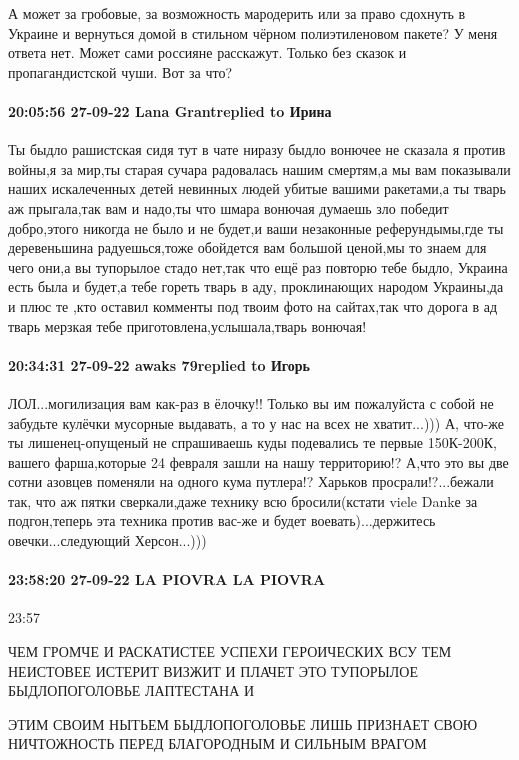 А может за гробовые, за возможность мародерить или за право сдохнуть в Украине
и вернуться домой в стильном чёрном полиэтиленовом пакете? У меня ответа нет.
Может сами россияне расскажут. Только без сказок и пропагандистской чуши. Вот
за что?

\paragraph{20:05:56 27-09-22 Lana Grantreplied to Ирина}

Ты быдло рашистская сидя тут в чате ниразу быдло вонючее не сказала я против
войны,я за мир,ты старая сучара радовалась нашим смертям,а мы вам показывали
наших искалеченных детей невинных людей убитые вашими ракетами,а ты тварь аж
прыгала,так вам и надо,ты что шмара вонючая думаешь зло победит добро,этого
никогда не было и не будет,и ваши незаконные реферундымы,где ты деревеньшина
радуешься,тоже обойдется вам большой ценой,мы то знаем для чего они,а вы
тупорылое стадо нет,так что ещё раз повторю тебе быдло, Украина есть была и
будет,а тебе гореть тварь в аду, проклинающих народом Украины,да и плюс те ,кто
оставил комменты под твоим фото на сайтах,так что дорога в ад тварь мерзкая
тебе приготовлена,услышала,тварь вонючая!

\paragraph{20:34:31 27-09-22 awaks 79replied to Игорь}

ЛОЛ...могилизация вам как-раз в ёлочку!! Только вы им пожалуйста с собой не
забудьте кулёчки мусорные выдавать, а то у нас на всех не хватит...))) А,
что-же ты лишенец-опущеный не спрашиваешь куды подевались те первые 150К-200К,
вашего фарша,которые 24 февраля зашли на нашу территорию!? А,что это вы две
сотни азовцев поменяли на одного кума путлера!? Харьков просрали!?...бежали
так, что аж пятки сверкали,даже технику всю бросили(кстати viele Dankе за
подгон,теперь эта техника против вас-же и будет воевать)...держитесь
овечки...следующий Херсон...)))

\paragraph{23:58:20 27-09-22 LA PIOVRA LA PIOVRA}
23:57

ЧЕМ ГРОМЧЕ И РАСКАТИСТЕЕ УСПЕХИ ГЕРОИЧЕСКИХ ВСУ ТЕМ НЕИСТОВЕЕ ИСТЕРИТ ВИЗЖИТ И
ПЛАЧЕТ ЭТО ТУПОРЫЛОЕ БЫДЛОПОГОЛОВЬЕ ЛАПТЕСТАНА И

ЭТИМ СВОИМ НЫТЬЕМ БЫДЛОПОГОЛОВЬЕ ЛИШЬ ПРИЗНАЕТ СВОЮ НИЧТОЖНОСТЬ ПЕРЕД
БЛАГОРОДНЫМ И СИЛЬНЫМ ВРАГОМ

